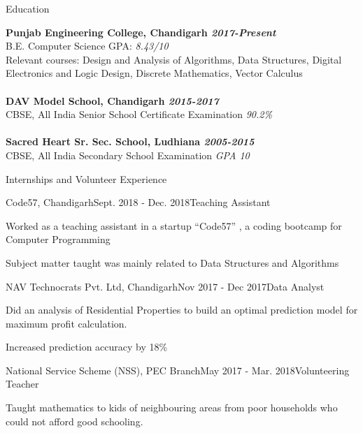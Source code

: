 \documentclass{resume} %
\begin{document}

\begin{rSection}{Education}

{\bf Punjab Engineering College, Chandigarh \hfill {\em2017-Present}} 
\\ B.E. Computer Science
\hfill GPA: \emph{8.43/10} 
\\ Relevant courses: Design and Analysis of Algorithms, Data Structures, Digital Electronics and Logic Design, Discrete Mathematics, Vector Calculus
\\ \\{\bf DAV Model School, Chandigarh \hfill {\em2015-2017}}\\
CBSE, All India Senior School Certificate Examination \hfill \emph{90.2\%}
\\ \\{\bf Sacred Heart Sr. Sec. School, Ludhiana \hfill {\em2005-2015}}\\
CBSE, All India Secondary School Examination \hfill \emph{GPA 10}
\end{rSection}

\begin{rSection}{Internships and Volunteer Experience}

\begin{rSubsection}{Code57, Chandigarh}{Sept. 2018 - Dec. 2018}{Teaching Assistant}{}
\item{Worked as a teaching assistant in a startup ``Code57'' , a coding bootcamp for Computer Programming}
\item{Subject matter taught was mainly related to Data Structures and Algorithms}\end{rSubsection}

\begin{rSubsection}{NAV Technocrats Pvt. Ltd, Chandigarh}{Nov 2017 - Dec 2017}{Data Analyst}{}
\item{Did an analysis of Residential Properties to build an optimal prediction model for maximum profit calculation.}
\item{Increased prediction accuracy by 18\%}\end{rSubsection}

\begin{rSubsection}{National Service Scheme (NSS), PEC Branch}{May 2017 - Mar. 2018}{Volunteering Teacher}{}
\item{Taught mathematics to kids of neighbouring areas from poor households who could not afford good schooling.}
\end{rSubsection}
\end{rSection}
\end{document}
